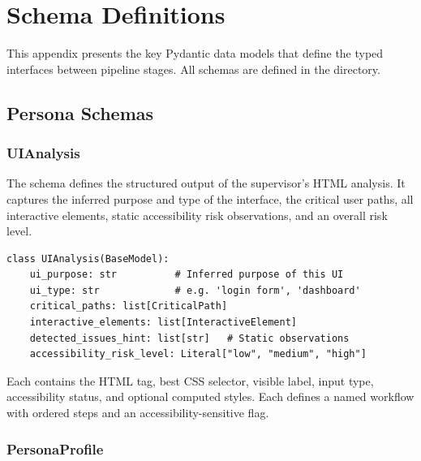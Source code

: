 \chapter{Schema Definitions}
\label{app:schemas}

This appendix presents the key Pydantic data models that define the typed interfaces between pipeline stages. All schemas are defined in the  directory.


\section{Persona Schemas}
\label{app:persona-schemas}

\subsection{UIAnalysis}

The  schema defines the structured output of the supervisor's HTML analysis. It captures the inferred purpose and type of the interface, the critical user paths, all interactive elements, static accessibility risk observations, and an overall risk level.

\begin{lstlisting}[caption={UIAnalysis Pydantic model (from \filepath{schemas/persona\_schema.py}).}, label={lst:uianalysis}]
class UIAnalysis(BaseModel):
    ui_purpose: str          # Inferred purpose of this UI
    ui_type: str             # e.g. 'login form', 'dashboard'
    critical_paths: list[CriticalPath]
    interactive_elements: list[InteractiveElement]
    detected_issues_hint: list[str]   # Static observations
    accessibility_risk_level: Literal["low", "medium", "high"]
\end{lstlisting}

Each  contains the HTML tag, best CSS selector, visible label, input type, accessibility status, and optional computed styles. Each  defines a named workflow with ordered steps and an accessibility-sensitive flag.

\subsection{PersonaProfile}

